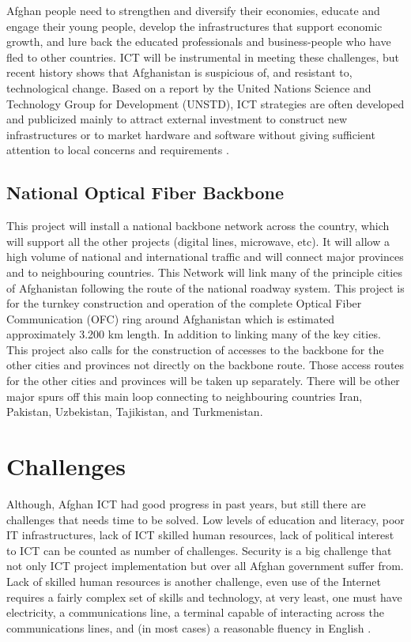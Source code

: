 Afghan people need to strengthen and diversify their economies, educate and engage their young people, develop the infrastructures that support economic growth, and lure back the educated professionals and business-people who have fled to other countries. ICT will be instrumental in meeting these challenges, but recent history shows that Afghanistan is suspicious of, and resistant to, technological change. Based on a report by the United Nations Science and Technology Group for Development (UNSTD), ICT strategies are often developed and publicized mainly to attract external investment to construct new infrastructures or to market hardware and software without giving sufficient attention to local concerns and requirements \cite{afg2}.\\


\subsection{National Optical Fiber Backbone}
This project will install a national backbone network across the country, which will support all the other projects (digital lines, microwave, etc). It will allow a high volume of national and international traffic and will connect major provinces and to neighbouring countries. This Network will link many of the principle cities of Afghanistan following the route of the national roadway system. This project is for the turnkey construction and operation of the complete Optical Fiber Communication (OFC) ring around Afghanistan which is estimated approximately 3.200 km length. In addition to linking many of the key cities. This project also calls for the construction of accesses to the backbone for the other cities and provinces not directly on the backbone route. Those access routes for the other cities and provinces will be taken up separately. There will be other major spurs off this main loop connecting to neighbouring countries Iran, Pakistan, Uzbekistan, Tajikistan, and Turkmenistan.\cite{afg1} 	


\section{Challenges}
Although, Afghan ICT had good progress in past years, but still there are challenges that needs time to be solved. Low levels of education and literacy, poor IT infrastructures, lack of ICT skilled human resources, lack of political interest to ICT can be counted as number of challenges. Security is a big challenge that not only ICT project implementation but over all Afghan government suffer from.  Lack of skilled human resources is another challenge, even use of the Internet requires a fairly complex set of skills and technology, at very least, one must have electricity, a communications line, a terminal capable of interacting across the communications lines, and (in most cases) a reasonable fluency in English \cite{afg3}. 


